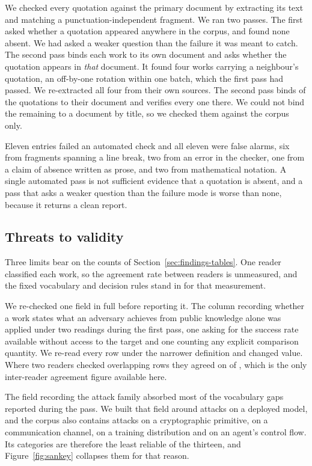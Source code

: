We checked every quotation against the primary document by extracting its text
and matching a punctuation-independent fragment. We ran two passes. The first
asked whether a quotation appeared anywhere in the corpus, and found none
absent. We had asked a weaker question than the failure it was meant to catch. The
second pass binds each work to its own document and asks whether the quotation
appears in \emph{that} document. It found four works carrying a neighbour's
quotation, an off-by-one rotation within one batch, which the first pass had
passed. We re-extracted all four from their own sources. The second pass binds
\QuoteBound{} of the \QuoteOnFile{} quotations to their document and verifies
every one there. We could not bind the remaining \QuoteUnbound{} to a document
by title, so we checked them against the corpus only.

Eleven entries failed an automated check and all eleven were false alarms, six
from fragments spanning a line break, two from an error in the checker, one
from a claim of absence written as prose, and two from mathematical notation.
A single automated pass is not sufficient evidence that a quotation is absent,
and a pass that asks a weaker question than the failure mode is worse than
none, because it returns a clean report.

\subsection{Threats to validity}

Three limits bear on the counts of Section~\ref{sec:findings-tables}. One
reader classified each work, so the agreement rate between readers is
unmeasured, and the fixed vocabulary and decision rules stand in for that
measurement.

We re-checked one field in full before reporting it. The column recording
whether a work states what an adversary achieves from public knowledge alone
was applied under two readings during the first pass, one asking for the
success rate available without access to the target and one counting any
explicit comparison quantity. We re-read every row under the narrower
definition and
\BaselineChanged{} changed value. Where two readers checked overlapping rows
they agreed on \AgreeOverlap{} of \AgreeTotal{}, which is the only
inter-reader agreement figure
available here.

The field recording the attack family absorbed most of the vocabulary gaps
reported during the pass. We built that field around attacks on a deployed
model, and the corpus also contains attacks on a cryptographic primitive, on a
communication channel, on a training distribution and on an agent's control
flow. Its categories are therefore the least reliable of the thirteen, and
Figure~\ref{fig:sankey} collapses them for that reason.
